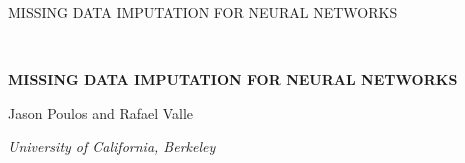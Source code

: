 \documentclass[10pt]{book}
\theoremstyle{definition}
\begin{document}

\renewcommand{\baselinestretch}{2}


{\hfill {\footnotesize\rm MISSING DATA IMPUTATION FOR NEURAL NETWORKS} \hfill}

\renewcommand{\thefootnote}{}
$\ $\par


\fontsize{12}{14pt plus.8pt minus .6pt}\selectfont \vspace{0.8pc}
\centerline{\large\bf MISSING DATA IMPUTATION FOR NEURAL NETWORKS}
\vspace{.4cm} \centerline{Jason Poulos and Rafael Valle} \vspace{.4cm} \centerline{\it
University of California, Berkeley} \vspace{.55cm} \fontsize{9}{11.5pt plus.8pt minus
.6pt}\selectfont

\end{document}
